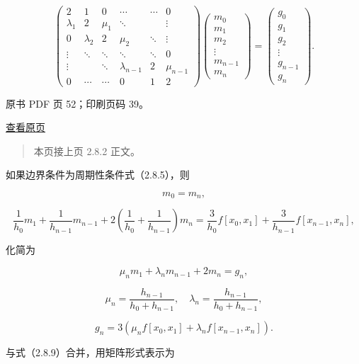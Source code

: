 \[\begin{pmatrix}
2&1&0&\cdots&\cdots&0\\
\lambda_1&2&\mu_1&\ddots&&\vdots\\
0&\lambda_2&2&\mu_2&\ddots&\vdots\\
\vdots&\ddots&\ddots&\ddots&\ddots&0\\
\vdots&&\ddots&\lambda_{n-1}&2&\mu_{n-1}\\
0&\cdots&\cdots&0&1&2
\end{pmatrix}
\begin{pmatrix}m_0\\m_1\\m_2\\\vdots\\m_{n-1}\\m_n\end{pmatrix}
=\begin{pmatrix}g_0\\g_1\\g_2\\\vdots\\g_{n-1}\\g_n\end{pmatrix}.\tag{2.8.14}\]

\clearpage

原书 PDF 页 52；印刷页码 39。

\href{source-images/pdf-052.jpeg}{查看原页}

\begin{quote}
本页接上页 2.8.2 正文。
\end{quote}

如果边界条件为周期性条件式（2.8.5），则

\[m_0=m_n,\]

\[\frac1{h_0}m_1+\frac1{h_{n-1}}m_{n-1}+2\left(\frac1{h_0}+\frac1{h_{n-1}}\right)m_n=\frac3{h_0}f[x_0,x_1]+\frac3{h_{n-1}}f[x_{n-1},x_n],\]

化简为

\[\mu_nm_1+\lambda_nm_{n-1}+2m_n=g_n,\]

\[\mu_n=\frac{h_{n-1}}{h_0+h_{n-1}},\quad\lambda_n=\frac{h_{n-1}}{h_0+h_{n-1}},\]

\[g_n=3(\mu_nf[x_0,x_1]+\lambda_nf[x_{n-1},x_n]).\]

与式（2.8.9）合并，用矩阵形式表示为

